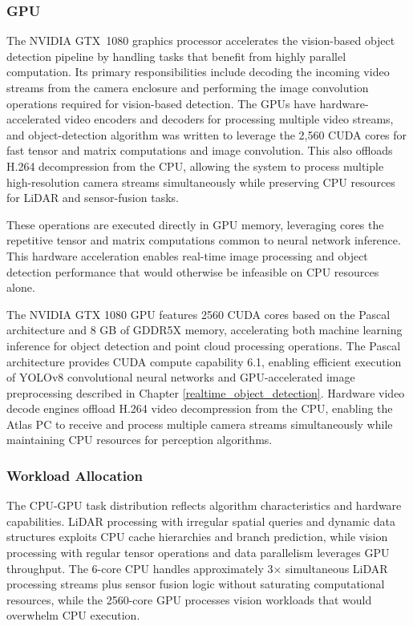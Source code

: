 \documentclass{erauthesis}
\begin{document}
\subsubsection{GPU}

The NVIDIA GTX~1080 graphics processor accelerates the vision-based object detection pipeline by handling tasks that benefit from highly parallel computation.  
Its primary responsibilities include decoding the incoming video streams from the camera enclosure and performing the image convolution operations required for vision-based detection.  
The GPUs have hardware-accelerated video encoders and decoders for processing multiple video streams, and object-detection algorithm was written to leverage the 2,560 CUDA cores for fast tensor and matrix computations and image convolution.
This also offloads H.264 decompression from the CPU, allowing the system to process multiple high-resolution camera streams simultaneously while preserving CPU resources for LiDAR and sensor-fusion tasks.

  
These operations are executed directly in GPU memory, leveraging  cores  the repetitive tensor and matrix computations common to neural network inference.  
This hardware acceleration enables real-time image processing and object detection performance that would otherwise be infeasible on CPU resources alone.

The NVIDIA GTX 1080 GPU features 2560 CUDA cores based on the Pascal architecture and 8 GB of GDDR5X memory, accelerating both machine learning inference for object detection and point cloud processing operations.
The Pascal architecture provides CUDA compute capability 6.1, enabling efficient execution of YOLOv8 convolutional neural networks and GPU-accelerated image preprocessing described in Chapter \ref{realtime_object_detection}.
Hardware video decode engines offload H.264 video decompression from the CPU, enabling the Atlas PC to receive and process multiple camera streams simultaneously while maintaining CPU resources for perception algorithms.

\subsubsection{Workload Allocation}

The CPU-GPU task distribution reflects algorithm characteristics and hardware capabilities.
LiDAR processing with irregular spatial queries and dynamic data structures exploits CPU cache hierarchies and branch prediction, while vision processing with regular tensor operations and data parallelism leverages GPU throughput.
The 6-core CPU handles approximately 3× simultaneous LiDAR processing streams plus sensor fusion logic without saturating computational resources, while the 2560-core GPU processes vision workloads that would overwhelm CPU execution.
\end{document}

